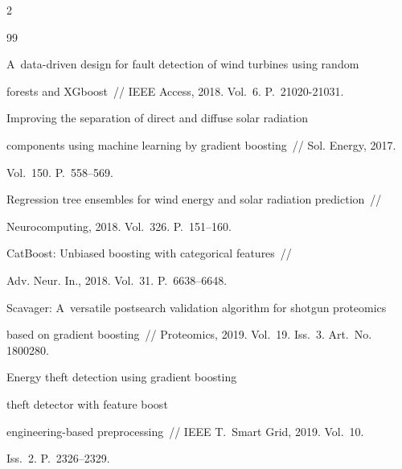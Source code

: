 \begin{multicols}{2}
{{\begin{thebibliography}{99}


 A~data-driven design for fault detection of wind turbines using random

forests and XGboost~// IEEE Access, 2018. Vol.~6. P.~21020-21031.





Improving the separation of direct and diffuse solar radiation 

components using machine learning by gradient boosting~// Sol. Energy, 2017. 

Vol.~150. P.~558--569.





 Regression tree ensembles for wind energy and solar radiation prediction~// 

 Neurocomputing, 2018. Vol.~326. P.~151--160.





CatBoost: Unbiased boosting with categorical features~// 

Adv. Neur. In., 2018. Vol.~31. P.~6638--6648.





Scavager: A~versatile postsearch validation algorithm for shotgun proteomics 

based on gradient boosting~// Proteomics, 2019. Vol.~19. Iss.~3. Art.~No.\,1800280.




 Energy theft detection using gradient boosting 

theft detector with feature boost

engineering-based preprocessing~// IEEE T.~Smart Grid, 2019. Vol.~10. 

Iss.~2. P.~2326--2329.




\end{thebibliography}}}
\end{multicols}
